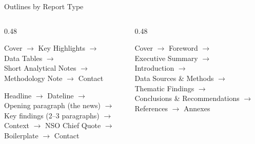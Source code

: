 \documentclass[xcolor={table,dvipsnames},aspectratio=169,11pt]{beamer}
\begin{document}
\begin{frame}{Outlines by Report Type}
    \begin{columns}[t]
        \begin{column}{0.48\textwidth}
            \begin{tcolorbox}[colback=nsoLight, colframe=nsoBlue, title=Statistical Bulletin, coltitle=white, boxrule=1pt, arc=3pt, fonttitle=\scriptsize\bfseries, fontupper=\scriptsize]
                Cover $\rightarrow$ Key Highlights $\rightarrow$ \\
                Data Tables $\rightarrow$ \\
                Short Analytical Notes $\rightarrow$ \\
                Methodology Note $\rightarrow$ Contact
            \end{tcolorbox}
            \begin{tcolorbox}[colback=nsoLight, colframe=nsoBlue, title=Press Release, coltitle=white, boxrule=1pt, arc=3pt, fonttitle=\scriptsize\bfseries, fontupper=\scriptsize]
                Headline $\rightarrow$ Dateline $\rightarrow$ \\
                Opening paragraph (the news) $\rightarrow$ \\
                Key findings (2--3 paragraphs) $\rightarrow$ \\
                Context $\rightarrow$ NSO Chief Quote $\rightarrow$ \\
                Boilerplate $\rightarrow$ Contact
            \end{tcolorbox}
        \end{column}
        \begin{column}{0.48\textwidth}
            \begin{tcolorbox}[colback=nsoLight, colframe=nsoBlue, title=Analytical Report, coltitle=white, boxrule=1pt, arc=3pt, fonttitle=\scriptsize\bfseries, fontupper=\scriptsize]
                Cover $\rightarrow$ Foreword $\rightarrow$ \\
                Executive Summary $\rightarrow$ \\
                Introduction $\rightarrow$ \\
                Data Sources \& Methods $\rightarrow$ \\
                Thematic Findings $\rightarrow$ \\
                Conclusions \& Recommendations $\rightarrow$ \\
                References $\rightarrow$ Annexes

\end{tcolorbox}
\end{column}
\end{columns}
\end{frame}
\end{document}
